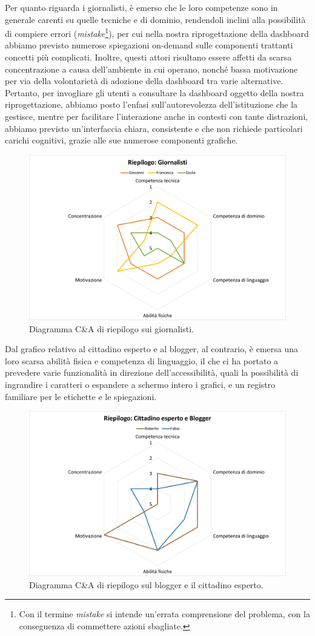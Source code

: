 \noindent
Per quanto riguarda i giornalisti, è emerso che le loro competenze sono in generale carenti su quelle tecniche e di dominio, rendendoli inclini alla possibilità di compiere errori (\textit{mistake}\footnote{Con il termine \textit{mistake} si intende un'errata comprensione del problema, con la conseguenza di commettere azioni sbagliate.}), per cui nella nostra riprogettazione della dashboard abbiamo previsto numerose spiegazioni on-demand sulle componenti trattanti concetti più complicati.
Inoltre, questi attori risultano essere affetti da scarsa concentrazione a causa dell'ambiente in cui operano, nonché bassa motivazione per via della volontarietà di adozione della dashboard tra varie alternative.
Pertanto, per invogliare gli utenti a consultare la dashboard oggetto della nostra riprogettazione, abbiamo posto l'enfasi sull'autorevolezza dell'istituzione che la gestisce, mentre per facilitare l'interazione anche in contesti con tante distrazioni, abbiamo previsto un'interfaccia chiara, consistente e che non richiede particolari carichi cognitivi, grazie alle sue numerose componenti grafiche.
\begin{figure}[H]
    \centering
    \includegraphics[width=0.5\columnwidth]{assets/images/proposta-design/caos/riepilogo-giornalisti}
    \caption{Diagramma C\&A di riepilogo sui giornalisti.}
\end{figure}

\noindent
Dal grafico relativo al cittadino esperto e al blogger, al contrario, è emersa una loro scarsa abilità fisica e competenza di linguaggio, il che ci ha portato a prevedere varie funzionalità in direzione dell'accessibilità, quali la possibilità di ingrandire i caratteri o espandere a schermo intero i grafici, e un registro familiare per le etichette e le spiegazioni.
\begin{figure}[H]
    \centering
    \includegraphics[width=0.5\columnwidth]{assets/images/proposta-design/caos/riepilogo-cittadini-altro}
    \caption{Diagramma C\&A di riepilogo sul blogger e il cittadino esperto.}
\end{figure}

